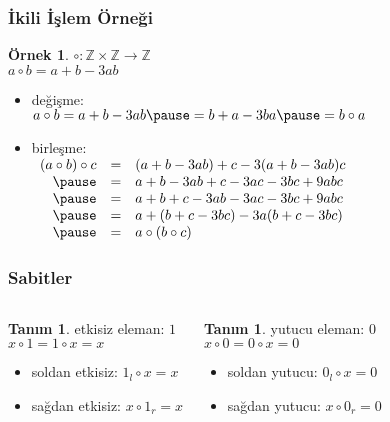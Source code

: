 \documentclass[dvipsnames]{beamer}
\theoremstyle{definition}
\newtheorem{tanim}[theorem]{Tanım}
\theoremstyle{example}
\newtheorem{ornek}[theorem]{Örnek}
\theoremstyle{plain}
\begin{document}
\begin{frame}
  \frametitle{İkili İşlem Örneği}

  \begin{ornek}
    $\circ: \mathbb{Z} \times \mathbb{Z} \rightarrow \mathbb{Z}$\\
    $a \circ b = a + b - 3ab$

    \pause
    \medskip
    \begin{itemize}
      \item değişme:\\
        $a \circ b = a + b - 3ab \pause
                   = b + a - 3ba \pause
                   = b \circ a$

      \pause
      \medskip
      \item birleşme:\\
        $\begin{array}{rcl}
          (a \circ b) \circ c & = & (a + b - 3ab) + c - 3 (a + b - 3ab) c\\ \pause
                              & = & a + b - 3ab + c - 3ac - 3bc + 9abc\\ \pause
                              & = & a + b + c - 3ab - 3ac - 3bc + 9abc\\ \pause
                              & = & a + (b + c - 3bc) - 3 a (b + c - 3bc)\\ \pause
                              & = & a \circ (b \circ c)
        \end{array}$
     \end{itemize}
 \end{ornek}
\end{frame}

\begin{frame}
  \frametitle{Sabitler}

  \begin{columns}
    \begin{tanim}
      \alert{etkisiz eleman}: $1$\\
      $x \circ 1 = 1 \circ x = x$

      \begin{itemize}
        \item soldan etkisiz: $1_l \circ x = x$
        \item sağdan etkisiz: $x \circ 1_r = x$
      \end{itemize}
    \end{tanim}

    \pause
    \begin{tanim}
      \alert{yutucu eleman}: $0$\\
      $x \circ 0 = 0 \circ x = 0$

      \begin{itemize}
        \item soldan yutucu: $0_l \circ x = 0$
        \item sağdan yutucu: $x \circ 0_r = 0$
      \end{itemize}
    \end{tanim}
  \end{columns}
\end{frame}
\end{document}
